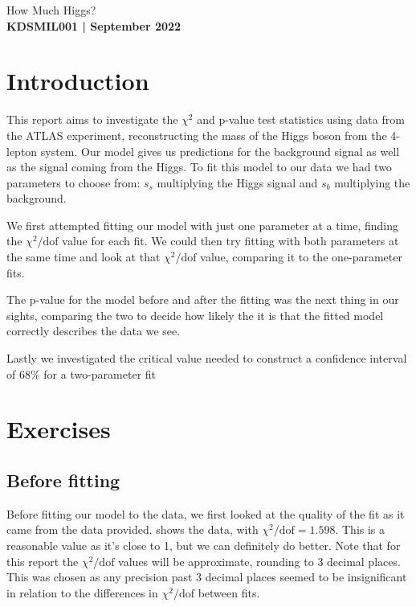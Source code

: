 \documentclass[11pt]{article}
\newcommand{\chisqdof}{\chi^2/\mathrm{dof}}
\numberwithin{equation}{section}
\numberwithin{figure}{section}
\numberwithin{table}{section}
\begin{document}
\begin{center}
    {\huge How Much Higgs?}\\
    \vspace{0.2in}
    \textbf{KDSMIL001 | September 2022}
    
    
\end{center}

\section{Introduction}\label{sec:Introduction}
This report aims to investigate the $\chi^2$ and p-value test statistics using data from the ATLAS experiment, reconstructing the mass of the Higgs boson from the 4-lepton system. Our model gives us predictions for the background signal as well as the signal coming from the Higgs. To fit this model to our data we had two parameters to choose from: $s_s$ multiplying the Higgs signal and $s_b$ multiplying the background. 

We first attempted fitting our model with just one parameter at a time, finding the $\chisqdof$ value for each fit. We could then try fitting with both parameters at the same time and look at that $\chisqdof$ value, comparing it to the one-parameter fits. 

The p-value for the model before and after the fitting was the next thing in our sights, comparing the two to decide how likely the it is that the fitted model correctly describes the data we see. 

Lastly we investigated the critical value needed to construct a confidence interval of $68\%$ for a two-parameter fit

\section{Exercises}\label{sec:Exercises}
\subsection{Before fitting}
Before fitting our model to the data, we first looked at the quality of the fit as it came from the data provided.  shows the data, with $\chisqdof=\num{1.598}$. This is a reasonable value as it's close to 1, but we can definitely do better. Note that for this report the $\chisqdof$ values will be approximate, rounding to 3 decimal places. This was chosen as any precision past 3 decimal places seemed to be insignificant in relation to the differences in $\chisqdof$ between fits.
\end{document}
